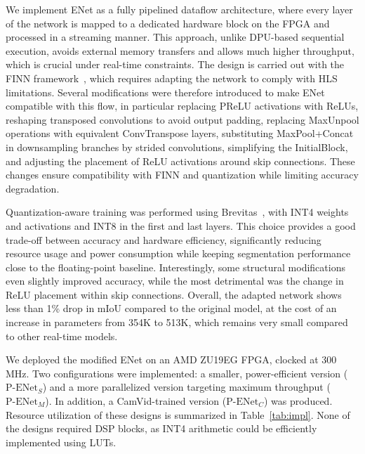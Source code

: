 \documentclass[11pt]{report}
\begin{document}
We implement ENet as a fully pipelined dataflow architecture, where every layer of the network is mapped to a dedicated hardware block on the FPGA and processed in a streaming manner. This approach, unlike DPU-based sequential execution, avoids external memory transfers and allows much higher throughput, which is crucial under real-time constraints. The design is carried out with the FINN framework~\cite{blott2018finnr, Umuroglu_2017}, which requires adapting the network to comply with HLS limitations. Several modifications were therefore introduced to make ENet compatible with this flow, in particular replacing PReLU activations with ReLUs, reshaping transposed convolutions to avoid output padding, replacing MaxUnpool operations with equivalent ConvTranspose layers, substituting MaxPool+Concat in downsampling branches by strided convolutions, simplifying the InitialBlock, and adjusting the placement of ReLU activations around skip connections. These changes ensure compatibility with FINN and quantization while limiting accuracy degradation.

Quantization-aware training was performed using Brevitas~\cite{brevitas}, with INT4 weights and activations and INT8 in the first and last layers. This choice provides a good trade-off between accuracy and hardware efficiency, significantly reducing resource usage and power consumption while keeping segmentation performance close to the floating-point baseline. Interestingly, some structural modifications even slightly improved accuracy, while the most detrimental was the change in ReLU placement within skip connections. Overall, the adapted network shows less than 1\% drop in mIoU compared to the original model, at the cost of an increase in parameters from 354K to 513K, which remains very small compared to other real-time models.

We deployed the modified ENet on an AMD ZU19EG FPGA, clocked at 300 MHz. Two configurations were implemented: a smaller, power-efficient version ($\text{P-ENet}_S$) and a more parallelized version targeting maximum throughput ($\text{P-ENet}_M$). In addition, a CamVid-trained version ($\text{P-ENet}_C$) was produced. Resource utilization of these designs is summarized in Table~\ref{tab:impl}. None of the designs required DSP blocks, as INT4 arithmetic could be efficiently implemented using LUTs.
\end{document}
